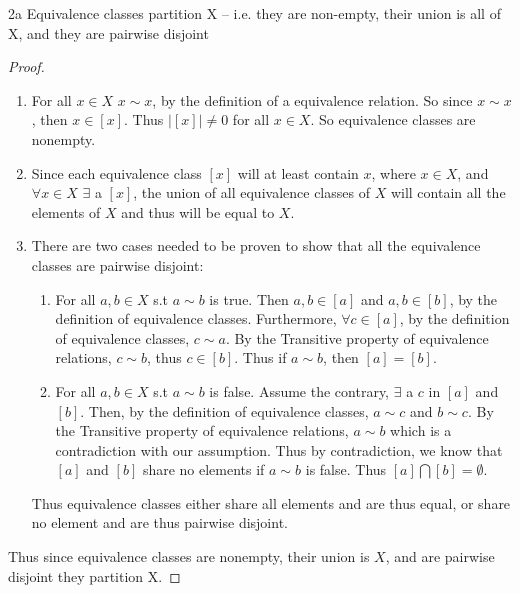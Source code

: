 \documentclass{article}
\newcommand{\abs}[1]{\lvert #1\rvert}
\begin{document}
\begin{claim}{2a}
	Equivalence classes partition X -- i.e. they are non-empty, their union is all of X, and they are pairwise disjoint
\end{claim}
\begin{proof}
	\begin{enumerate}
		\item For all $x \in X$ $x \sim x$, by the definition of a equivalence relation. So since $x \sim x$, then $x \in [x]$. Thus $\abs{[x]} \neq 0$ for all $x \in X$. So equivalence classes are nonempty.
		\item Since each equivalence class $[x]$ will at least contain $x$, where $x \in X$, and $\forall x \in X$ $\exists$ a $[x]$, the union of all equivalence classes of $X$ will contain all the elements of $X$ and thus will be equal to $X$.
		\item There are two cases needed to be proven to show that all the equivalence classes are pairwise disjoint:
		      \begin{enumerate}
			      \item For all $a, b \in X$ s.t $a \sim b$ is true. Then $a, b \in [a]$ and $a, b \in [b]$, by the definition of equivalence classes. Furthermore, $\forall c \in [a]$, by the definition of equivalence classes, $c \sim a$. By the Transitive property of equivalence relations, $c \sim b$, thus $c \in [b]$. Thus if $a \sim b$, then $[a] = [b]$.
			      \item For all $a, b \in X$ s.t $a \sim b$ is false. Assume the contrary, $\exists$ a $c$ in $[a]$ and $[b]$. Then, by the definition of equivalence classes, $a \sim c$ and $b \sim c$. By the Transitive property of equivalence relations, $a \sim b$ which is a contradiction with our assumption. Thus by contradiction, we know that $[a]$ and $[b]$ share no elements if $a \sim b$ is false.
			            Thus $[a] \bigcap [b] = \emptyset$.
		      \end{enumerate}
		      Thus equivalence classes either share all elements and are thus equal, or share no element and are thus pairwise disjoint.
	\end{enumerate}

	Thus since equivalence classes are nonempty, their union is $X$, and are pairwise disjoint they partition X.
\end{proof}

\bigskip
\end{document}
